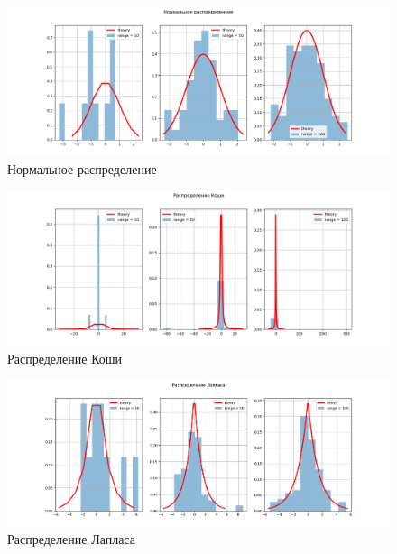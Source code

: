 \documentclass[12pt]{report}
\begin{document}
\begin{figure}[h!]
\begin{center}
\includegraphics[width=\textwidth]{../lab_1/pic/normal.png} 
\caption{Нормальное распределение}
\end{center}
\end{figure}

\begin{figure}[h!]
\begin{center}
\includegraphics[width=\textwidth]{../lab_1/pic/caushi.png}
\caption{Распределение Коши}
\end{center}
\end{figure}

\pagebreak

\begin{figure}[h!]
\begin{center}
\includegraphics[width=\textwidth]{../lab_1/pic/laplace.png}
\caption{Распределение Лапласа}
\end{center}
\end{figure}
\end{document}
